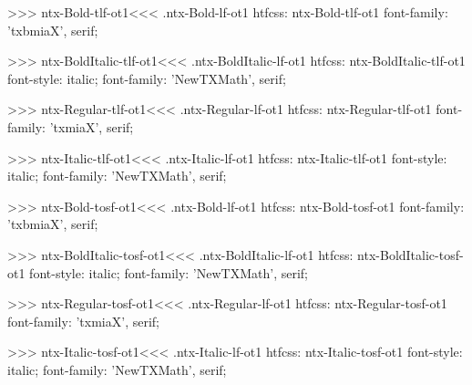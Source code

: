>>>
\<ntx-Bold-tlf-ot1\><<<
.ntx-Bold-lf-ot1
htfcss:  ntx-Bold-tlf-ot1  font-family: 'txbmiaX', serif;

>>>
\<ntx-BoldItalic-tlf-ot1\><<<
.ntx-BoldItalic-lf-ot1
htfcss:  ntx-BoldItalic-tlf-ot1  font-style: italic; font-family: 'NewTXMath', serif;

>>>
\<ntx-Regular-tlf-ot1\><<<
.ntx-Regular-lf-ot1
htfcss:  ntx-Regular-tlf-ot1  font-family: 'txmiaX', serif;

>>>
\<ntx-Italic-tlf-ot1\><<<
.ntx-Italic-lf-ot1
htfcss:  ntx-Italic-tlf-ot1  font-style: italic; font-family: 'NewTXMath', serif;

>>>
\<ntx-Bold-tosf-ot1\><<<
.ntx-Bold-lf-ot1
htfcss:  ntx-Bold-tosf-ot1  font-family: 'txbmiaX', serif;

>>>
\<ntx-BoldItalic-tosf-ot1\><<<
.ntx-BoldItalic-lf-ot1
htfcss:  ntx-BoldItalic-tosf-ot1  font-style: italic; font-family: 'NewTXMath', serif;

>>>
\<ntx-Regular-tosf-ot1\><<<
.ntx-Regular-lf-ot1
htfcss:  ntx-Regular-tosf-ot1  font-family: 'txmiaX', serif;

>>>
\<ntx-Italic-tosf-ot1\><<<
.ntx-Italic-lf-ot1
htfcss:  ntx-Italic-tosf-ot1  font-style: italic; font-family: 'NewTXMath', serif;

